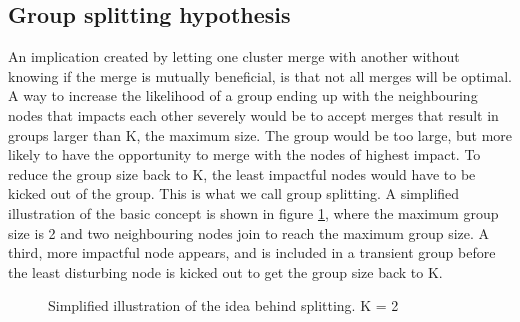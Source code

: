\subsection{Group splitting hypothesis}
An implication created by letting one cluster merge with another without knowing if the merge is mutually beneficial, is that not all merges will be optimal.
A way to increase the likelihood of a group ending up with the neighbouring nodes that impacts each other severely would be to accept merges that result in groups larger than K, the maximum size. 
The group would be too large, but more likely to have the opportunity to merge with the nodes of highest impact. To reduce the group size back to K,
the least impactful nodes would have to be kicked out of the group. This is what we call group splitting. A simplified illustration of the basic concept is shown in figure \ref{fig:splitting},
where the maximum group size is 2 and two neighbouring nodes join to reach the maximum group size. A third, more impactful node appears, and is included in a transient group
before the least disturbing node is kicked out to get the group size back to K. 

\begin{figure}
	\centering
		\qquad
		\qquad

		\qquad
		\qquad
		\caption{Simplified illustration of the idea behind splitting. K = 2}%
		\label{fig:splitting}%
\end{figure}



